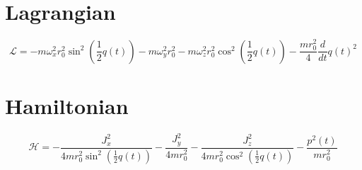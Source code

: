 \documentclass{article}%
\begin{document}
%
\normalsize%
\section*{Lagrangian}%
\begin{dmath}%
\mathcal{L} = - m \omega_{x}^{2} r_{0}^{2} \sin^{2}{\left (\frac{1}{2} q{\left (t \right )} \right )} - m \omega_{y}^{2} r_{0}^{2} - m \omega_{z}^{2} r_{0}^{2} \cos^{2}{\left (\frac{1}{2} q{\left (t \right )} \right )} - \frac{m r_{0}^{2}}{4} \frac{d}{d t} q{\left (t \right )}^{2}%
\end{dmath}

%
\section*{Hamiltonian}%
\begin{dmath}%
\mathcal{H} = - \frac{J_{x}^{2}}{4 m r_{0}^{2} \sin^{2}{\left (\frac{1}{2} q{\left (t \right )} \right )}} - \frac{J_{y}^{2}}{4 m r_{0}^{2}} - \frac{J_{z}^{2}}{4 m r_{0}^{2} \cos^{2}{\left (\frac{1}{2} q{\left (t \right )} \right )}} - \frac{p^{2}{\left (t \right )}}{m r_{0}^{2}}%
\end{dmath}

%
\end{document}
